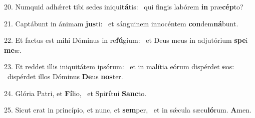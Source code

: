 20. Numquid adhǽret tibi sedes iniqui\textbf{tá}tis: \ast\  qui fingis labórem \textbf{in} præ\textbf{cép}to?\

21. Captábunt in ánimam \textbf{jus}ti: \ast\  et sánguinem innocéntem \textbf{con}dem\textbf{ná}bunt.\

22. Et factus est mihi Dóminus in re\textbf{fú}gium: \ast\  et Deus meus in adjutórium \textbf{spe}i \textbf{me}æ.\

23. Et reddet illis iniquitátem ipsórum: \dag\  et in malítia eórum dispérdet \textbf{e}os: \ast\  dispérdet illos Dóminus \textbf{De}us \textbf{nos}ter.\

24. Glória Patri, et \textbf{Fí}lio, \ast\  et Spi\textbf{rí}tui \textbf{Sanc}to.\

25. Sicut erat in princípio, et nunc, et \textbf{sem}per, \ast\  et in sǽcula sæcu\textbf{ló}rum. \textbf{A}men.\

